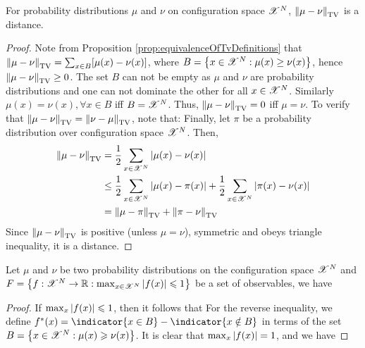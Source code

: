 \documentclass[letterpaper,english,10pt]{article}
\begin{document}
\begin{prop}
For probability distributions $\mu$ and $\nu$ on configuration space $\mathscr{X}^N$, $\left\lVert\mu-\nu\right\rVert_{\text{TV}}$ is a distance.
\end{prop}
\begin{proof}
Note from Proposition \ref{prop:equivalenceOfTvDefinitions} that $\left\lVert\mu-\nu\right\rVert_{\text{TV}} = \sum_{x \in B}[\mu(x) - \nu(x)]$, where $B = \left\{x \in \mathscr{X}^N: \mu(x) \geq \nu(x)\right\}$, hence $\left\lVert\mu-\nu\right\rVert_{\text{TV}} \geq 0$. The set $B$ can not be empty as $\mu$ and $\nu$ are probability distributions and one can not dominate the other for all $x \in \mathscr{X}^N$. Similarly $\mu(x) = \nu(x), \forall x \in B$ iff $B = \mathscr{X}^N$. Thus, $\left\lVert\mu-\nu\right\rVert_{\text{TV}} = 0$ iff $\mu = \nu$. To verify that $\left\lVert\mu-\nu\right\rVert_{\text{TV}} = \left\lVert\nu-\mu\right\rVert_{\text{TV}}$, note that:
Finally, let $\pi$ be a probability distribution over configuration space $\mathscr{X}^N$. Then,
\begin{align*}
\left\lVert\mu-\nu\right\rVert_{\text{TV}} &= \frac{1}{2} \sum_{x \in \mathscr{X}^N} \left\lvert\mu(x) - \nu(x)\right\rvert \\
&\leq \frac{1}{2} \sum_{x \in \mathscr{X}^N} \left\lvert\mu(x) - \pi(x)\right\rvert + \frac{1}{2} \sum_{x \in \mathscr{X}^N} \left\lvert\pi(x) - \nu(x)\right\rvert \\
&= \left\lVert\mu-\pi\right\rVert_{\text{TV}} + \left\lVert\pi-\nu\right\rVert_{\text{TV}}
\end{align*}
Since $\left\lVert\mu-\nu\right\rVert_{\text{TV}}$ is positive (unless $\mu = \nu$), symmetric and obeys triangle inequality, it is a distance. 
\end{proof}
\begin{prop}
Let $\mu$ and $\nu$ be two probability distributions on the configuration space $\mathscr{X}^N$ and $F = \left\{f:\mathscr{X}^N \to \mathbb{R} : \max_{x \in \mathscr{X}^N}\left\lvert f(x)\right\rvert \leqslant 1\right\}$ be a set of observables, we have 
\end{prop}
\begin{proof}
If $\max_x\left\lvert f(x)\right\rvert \leqslant 1$, then it follows that 
For the reverse inequality, we define $f^{\ast}(x) = \indicator{x \in B}-\indicator{x \notin B}$ in terms of the set $B = \left\{x \in \mathscr{X}^N: \mu(x) \geqslant \nu(x)\right\}$. 
It is clear that $\max_x\left\lvert f(x)\right\rvert = 1$, and we have 
\end{proof}
\end{document}
